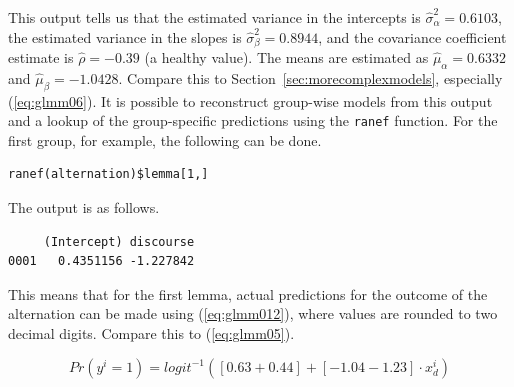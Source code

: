 \documentclass[a4paper,12pt]{article}
\begin{document}
\enlargethispage{\baselineskip}

This output tells us that the estimated variance in the intercepts is $\hat{\sigma}_{\alpha}^2=0.6103$, the estimated variance in the slopes is $\hat{\sigma}_{\beta}^2=0.8944$, and the covariance coefficient estimate is $\hat{\rho}=-0.39$ (a healthy value).
The means are estimated as $\hat{\mu}_{\alpha}=0.6332$ and $\hat{\mu}_{\beta}=-1.0428$.
Compare this to Section~\ref{sec:morecomplexmodels}, especially (\ref{eq:glmm06}).
It is possible to reconstruct group-wise models from this output and a lookup of the group-specific predictions using the \texttt{ranef} function.
For the first group, for example, the following can be done.

\vspace{0.5\baselineskip}

\begin{lstlisting}
ranef(alternation)$lemma[1,]
\end{lstlisting}

The output is as follows.

\vspace{0.5\baselineskip}

\begin{lstlisting}
     (Intercept) discourse
0001   0.4351156 -1.227842
\end{lstlisting}

This means that for the first lemma, actual predictions for the outcome of the alternation can be made using (\ref{eq:glmm012}), where values are rounded to two decimal digits.
Compare this to (\ref{eq:glmm05}).

\begin{equation}
  Pr(y^i=1)=logit^{-1}( [0.63+0.44] + [-1.04-1.23]\cdot x_d^i )
  \label{eq:glmm012}
\end{equation}

% 
\end{document}
